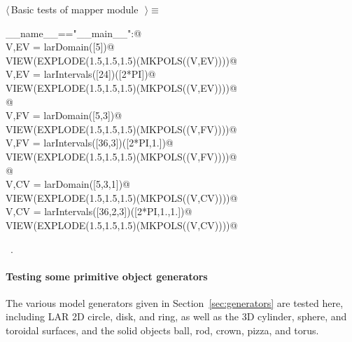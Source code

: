 \documentclass[11pt,oneside]{article}	%
\begin{document}
\begin{flushleft} \small \label{scrap46}
$\langle\,$Basic tests of mapper module\nobreak\ {\footnotesize {}}$\,\rangle\equiv$
\vspace{-1ex}
\begin{list}{}{} \item
\mbox{}\verb@if __name__=="__main__":@\\
\mbox{}\verb@   V,EV = larDomain([5])@\\
\mbox{}\verb@   VIEW(EXPLODE(1.5,1.5,1.5)(MKPOLS((V,EV))))@\\
\mbox{}\verb@   V,EV = larIntervals([24])([2*PI])@\\
\mbox{}\verb@   VIEW(EXPLODE(1.5,1.5,1.5)(MKPOLS((V,EV))))@\\
\mbox{}\verb@      @\\
\mbox{}\verb@   V,FV = larDomain([5,3])@\\
\mbox{}\verb@   VIEW(EXPLODE(1.5,1.5,1.5)(MKPOLS((V,FV))))@\\
\mbox{}\verb@   V,FV = larIntervals([36,3])([2*PI,1.])@\\
\mbox{}\verb@   VIEW(EXPLODE(1.5,1.5,1.5)(MKPOLS((V,FV))))@\\
\mbox{}\verb@      @\\
\mbox{}\verb@   V,CV = larDomain([5,3,1])@\\
\mbox{}\verb@   VIEW(EXPLODE(1.5,1.5,1.5)(MKPOLS((V,CV))))@\\
\mbox{}\verb@   V,CV = larIntervals([36,2,3])([2*PI,1.,1.])@\\
\mbox{}\verb@   VIEW(EXPLODE(1.5,1.5,1.5)(MKPOLS((V,CV))))@\\
\mbox{}\verb@@{\NWsep}
\end{list}
\vspace{-1ex}
\footnotesize\addtolength{\baselineskip}{-1ex}
\begin{list}{}{\setlength{\itemsep}{-\parsep}\setlength{\itemindent}{-\leftmargin}}
\item \NWtxtMacroRefIn\ .
\end{list}
\end{flushleft}

\paragraph{Testing some primitive object generators}
The various model generators given in Section~\ref{sec:generators} are tested here, including LAR 2D circle, disk, and ring, as well as the 3D cylinder, sphere, and toroidal surfaces, and the solid objects ball, rod, crown, pizza, and torus.
\end{document}
